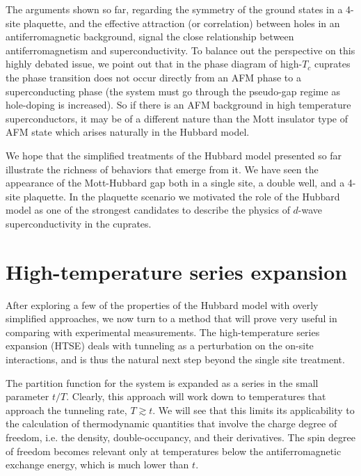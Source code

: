 The arguments shown so far, regarding the symmetry of the ground states in a
4-site plaquette, and the effective attraction (or correlation) between holes
in an antiferromagnetic background, signal the close relationship between
antiferromagnetism and superconductivity.   To balance out the perspective on
this highly debated issue, we point out that in the phase diagram of
high-$T_{c}$ cuprates the  phase transition does not occur directly from an AFM
phase to a superconducting phase (the system must go through the pseudo-gap
regime as hole-doping is increased).  So if there is an AFM background in high
temperature superconductors, it may be of a different nature than the Mott
insulator type of AFM state which arises naturally in the Hubbard model. 


We hope that the simplified treatments of the Hubbard model presented so far
illustrate the richness of behaviors that emerge from it.   We have seen the
appearance of the Mott-Hubbard gap both in a single site, a double well, and a
4-site plaquette.  In the plaquette scenario we motivated the role of the
Hubbard model as one of the strongest candidates to describe the physics of
$d$-wave superconductivity in the cuprates. 
 

\section{ High-temperature series expansion } 


After exploring a few of the properties of the Hubbard model with overly
simplified approaches, we now turn to a method that will prove very useful in
comparing with experimental measurements.   The high-temperature series
expansion (HTSE) deals with tunneling as a perturbation on the on-site
interactions, and is thus the natural next step beyond the single site
treatment.  

 The partition function for the system is expanded as a series in the small
parameter $t/T$.   Clearly, this approach will work down to temperatures that
approach the tunneling rate, $T \gtrsim t$. We will see that this limits its
applicability to the calculation of thermodynamic quantities that involve the
charge degree of freedom, i.e. the density, double-occupancy, and their
derivatives.   The spin degree of freedom becomes relevant only at temperatures
below the antiferromagnetic exchange energy, which is much lower than $t$. 

